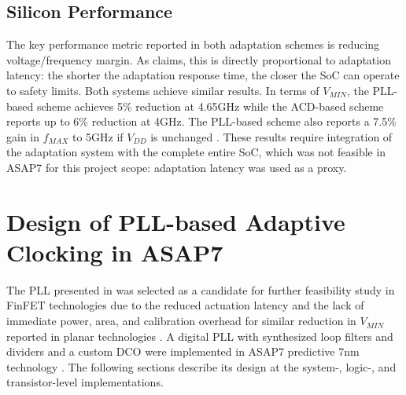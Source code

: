 \documentclass[twoside,9pt,journal,letterpage]{IEEEtran}
\begin{document}
\subsection{Silicon Performance}
\label{sec:performance}
The key performance metric reported in both adaptation schemes is reducing voltage/frequency margin. As \cite{hashimoto2018} claims, this is directly proportional to adaptation latency: the shorter the adaptation response time, the closer the SoC can operate to safety limits. Both systems achieve similar results. In terms of $V_{MIN}$, the PLL-based scheme achieves 5\% reduction at 4.65GHz \cite{hashimoto2018} while the ACD-based scheme reports up to 6\% reduction \cite{wilcox2015} at 4GHz. The PLL-based scheme also reports a 7.5\% gain in $f_{MAX}$ to 5GHz if $V_{DD}$ is unchanged \cite{hashimoto2018}. These results require integration of the adaptation system with the complete entire SoC, which was not feasible in ASAP7 for this project scope: adaptation latency was used as a proxy.

\section{Design of PLL-based Adaptive Clocking in ASAP7}
\label{sec:pll-design}

The PLL presented in \cite{hashimoto2018} was selected as a candidate for further feasibility study in FinFET technologies due to the reduced actuation latency and the lack of immediate power, area, and calibration overhead for similar reduction in $V_{MIN}$ reported in planar technologies \cite{hashimoto2018,wilcox2015}. A digital PLL with synthesized loop filters and dividers and a custom DCO were implemented in ASAP7 predictive 7nm technology \cite{asap7}. The following sections describe its design at the system-, logic-, and transistor-level implementations.

\vspace{-5pt}
\end{document}
